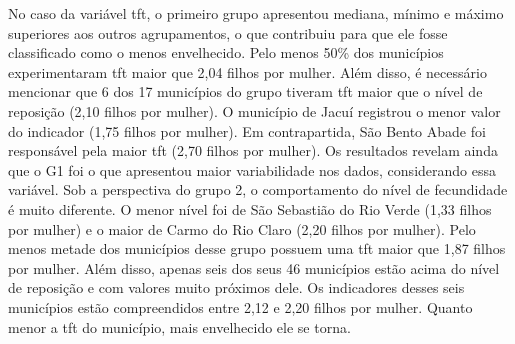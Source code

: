 \documentclass[10pt,twoside]{article}
\begin{document}
No caso da variável tft, o primeiro grupo apresentou mediana, mínimo e máximo superiores aos outros agrupamentos, o que contribuiu para que ele fosse classificado como o menos envelhecido. Pelo menos 50\% dos municípios experimentaram tft maior que 2,04 filhos por mulher. Além disso, é necessário mencionar que 6 dos 17 municípios do grupo tiveram tft maior que o nível de reposição (2,10 filhos por mulher). O município de Jacuí registrou o menor valor do indicador (1,75 filhos por mulher). Em contrapartida, São Bento Abade foi responsável pela maior tft (2,70 filhos por mulher). Os resultados revelam ainda que o G1 foi o que apresentou maior variabilidade nos dados, considerando essa variável. Sob a perspectiva do grupo 2, o comportamento do nível de fecundidade é muito diferente. O menor nível foi de São Sebastião do Rio Verde (1,33 filhos por mulher) e o maior de Carmo do Rio Claro (2,20 filhos por mulher). Pelo menos metade dos municípios desse grupo possuem uma tft maior que 1,87 filhos por mulher. Além disso, apenas seis dos seus 46 municípios estão acima do nível de reposição e com valores muito próximos dele. Os indicadores desses seis municípios estão compreendidos entre 2,12 e 2,20 filhos por mulher. Quanto menor a tft do município, mais envelhecido ele se torna.
\end{document}
